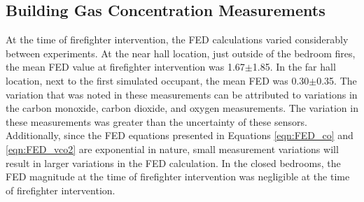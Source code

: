 \documentclass[12pt,oneside]{book}
\begin{document}

\subsection{Building Gas Concentration Measurements}
At the time of firefighter intervention, the FED calculations varied considerably between experiments. At the near hall location, just outside of the bedroom fires,  the mean FED value at firefighter intervention was 1.67$\pm$1.85. In the far hall location, next to the first simulated occupant, the mean FED was 0.30$\pm$0.35. The variation that was noted in these measurements can be attributed to variations in the carbon monoxide, carbon dioxide, and oxygen measurements. The variation in these measurements was greater than the uncertainty of these sensors. Additionally, since the FED equations presented in Equations \ref{eqn:FED_co} and \ref{eqn:FED_vco2} are exponential in nature, small measurement variations will result in larger variations in the FED calculation. In the closed bedrooms, the FED magnitude at the time of firefighter intervention was negligible at the time of firefighter intervention. 
\end{document}
